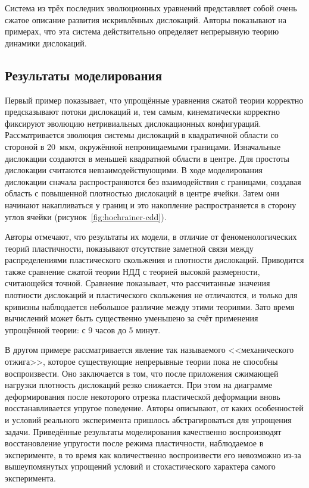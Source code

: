 \documentclass[a4paper, 14pt, titlepage]{extarticle}
\begin{document}
  Система из трёх последних эволюционных уравнений представляет собой очень сжатое описание развития
  искривлённых дислокаций. Авторы показывают на примерах, что эта система действительно
  определяет непрерывную теорию динамики дислокаций.

  \subsection{Результаты моделирования}

  Первый пример показывает, что упрощённые уравнения сжатой теории корректно предсказывают потоки
  дислокаций и, тем самым, кинематически корректно фиксируют эволюцию нетривиальных дислокационных
  конфигураций. Рассматривается эволюция системы дислокаций в квадратичной области со стороной в
  20~мкм, окружённой непроницаемыми границами. Изначальные дислокации создаются в меньшей квадратной
  области в центре. Для простоты дислокации считаются невзаимодействующими. В ходе моделирования
  дислокации сначала распространяются без взаимодействия с границами, создавая область с повышенной
  плотностью дислокаций в центре ячейки. Затем они начинают накапливаться у границ и это накопление
  распространяется в сторону углов ячейки (рисунок~\ref{fig:hochrainer-cdd}).


  Авторы отмечают, что результаты их модели, в отличие от
  феноменологических теорий пластичности, показывают отсутствие заметной связи между распределениями
  пластического скольжения и плотности дислокаций. Приводится также сравнение сжатой теории НДД с
  теорией высокой размерности, считающейся точной. Сравнение показывает, что рассчитанные значения
  плотности дислокаций и пластического скольжения не отличаются, и только для кривизны наблюдается
  небольшое различие между этими теориями. Зато время вычислений может быть существенно уменьшено
  за счёт применения упрощённой теории: с 9 часов до 5 минут.

  В другом примере рассматривается явление так называемого <<механического отжига>>, которое
  существующие непрерывные теории пока не способны воспроизвести. Оно заключается в том, что после
  приложения сжимающей нагрузки плотность дислокаций резко снижается. При этом на диаграмме
  деформирования после некоторого отрезка пластической деформации вновь восстанавливается упругое
  поведение. Авторы описывают, от каких особенностей и условий реального эксперимента пришлось
  абстрагироваться для упрощения задачи. Приведённые результаты моделирования качественно
  воспроизводят восстановление упругости после режима пластичности, наблюдаемое в эксперименте, в то
  время как количественно воспроизвести его невозможно из-за вышеупомянутых упрощений условий и
  стохастического характера самого эксперимента.
\end{document}
